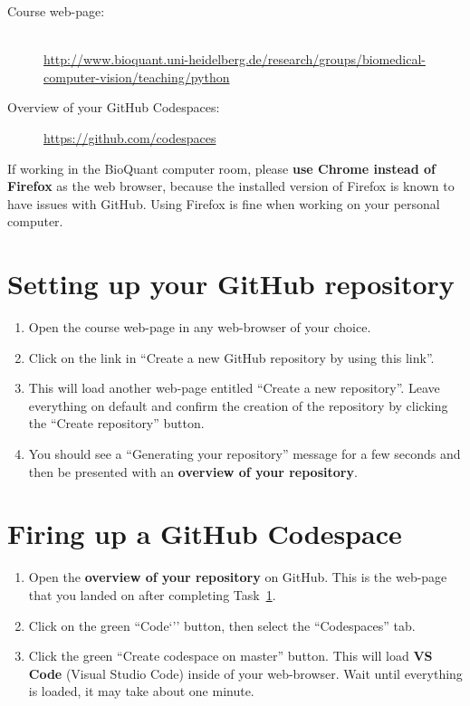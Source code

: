 \documentclass[12pt,a4paper]{article}
\begin{document}

\begin{sloppypar}
\begin{description}
\item[Course web-page:]~\\\url{http://www.bioquant.uni-heidelberg.de/research/groups/biomedical-computer-vision/teaching/python}
\item[Overview of your GitHub Codespaces:] \url{https://github.com/codespaces}
\end{description}
\end{sloppypar}

If working in the BioQuant computer room, please \textbf{use Chrome instead of Firefox} as the web browser, because the installed version of Firefox is known to have issues with GitHub. Using Firefox is fine when working on your personal computer.

\section{Setting up your GitHub repository}
\label{task:preparation}
\begin{enumerate}
\item Open the course web-page in any web-browser of your choice.
\item Click on the link in ``Create a new GitHub repository by using this link''.
\item This will load another web-page entitled ``Create a new repository''. Leave everything on default and confirm the creation of the repository by clicking the ``Create repository'' button.
\item You should see a ``Generating your repository'' message for a few seconds and then be presented with an \textbf{overview of your repository}.
\end{enumerate}

\section{Firing up a GitHub Codespace}
\label{task:codespaces}
\begin{enumerate}
\item Open the \textbf{overview of your repository} on GitHub. This is the web-page that you landed on after completing Task~\ref{task:preparation}.
\item Click on the green ``Code`'' button, then select the ``Codespaces'' tab.
\item Click the green ``Create codespace on master'' button. This will load \textbf{VS Code} (Visual Studio Code) inside of your web-browser. Wait until everything is loaded, it may take about one minute.
\end{enumerate}
\end{document}
